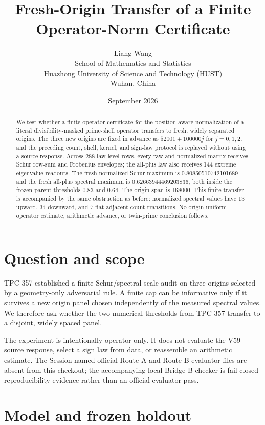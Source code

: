 \documentclass[10pt]{article}
\title{Fresh-Origin Transfer of a Finite Operator-Norm Certificate}
\author{Liang Wang\\
\small School of Mathematics and Statistics\\
\small Huazhong University of Science and Technology (HUST)\\
\small Wuhan, China}
\date{September 2026}
\begin{document}
\maketitle

\begin{abstract}
We test whether a finite operator certificate for the position-aware
normalization of a literal divisibility-masked prime-shell operator transfers
to fresh, widely separated origins.  The three new origins are fixed in
advance as $52001+100000j$ for $j=0,1,2$, and the preceding count, shell,
kernel, and sign-law protocol is replayed without using a source response.
Across 288 law-level rows, every raw and normalized matrix receives Schur
row-sum and Frobenius envelopes; the all-plus law also receives 144 extreme
eigenvalue readouts.  The fresh normalized Schur maximum is
0.80850510742101689 and the fresh all-plus spectral maximum is
0.62663944469203836, both inside the frozen parent thresholds $0.83$ and
$0.64$.  The origin span is 168000.  This finite transfer is accompanied by
the same obstruction as before: normalized spectral values have 13 upward,
34 downward, and 7 flat adjacent count transitions.  No origin-uniform
operator estimate, arithmetic advance, or twin-prime conclusion follows.
\end{abstract}

\section{Question and scope}

TPC-357 established a finite Schur/spectral scale audit on three origins
selected by a geometry-only adversarial rule.  A finite cap can be informative
only if it survives a new origin panel chosen independently of the measured
spectral values.  We therefore ask whether the two numerical thresholds from
TPC-357 transfer to a disjoint, widely spaced panel.

The experiment is intentionally operator-only.  It does not evaluate the V59
source response, select a sign law from data, or reassemble an arithmetic
estimate.  The Session-named official Route-A and Route-B evaluator files are
absent from this checkout; the accompanying local Bridge-B checker is
fail-closed reproducibility evidence rather than an official evaluator pass.

\section{Model and frozen holdout}
\end{document}
